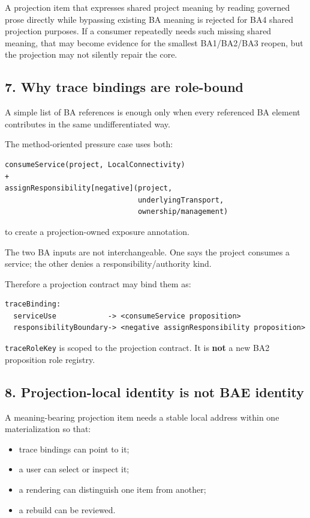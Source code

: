 \documentclass[11pt,a4paper]{article}
\providecommand{\tightlist}{\setlength{\itemsep}{0pt}\setlength{\parskip}{0pt}}
\begin{document}
A projection item that expresses shared project meaning by reading governed prose directly while bypassing existing BA meaning is rejected for BA4 shared projection purposes. If a consumer repeatedly needs such missing shared meaning, that may become evidence for the smallest BA1/BA2/BA3 reopen, but the projection may not silently repair the core.

\subsection{7. Why trace bindings are role-bound}\label{7-why-trace-bindings-are-role-bound}

A simple list of BA references is enough only when every referenced BA element contributes in the same undifferentiated way.

The method-oriented pressure case uses both:

\begin{verbatim}
consumeService(project, LocalConnectivity)
+
assignResponsibility[negative](project,
                               underlyingTransport,
                               ownership/management)
\end{verbatim}

to create a projection-owned exposure annotation.

The two BA inputs are not interchangeable. One says the project consumes a service; the other denies a responsibility/authority kind.

Therefore a projection contract may bind them as:

\begin{verbatim}
traceBinding:
  serviceUse            -> <consumeService proposition>
  responsibilityBoundary-> <negative assignResponsibility proposition>
\end{verbatim}

\texttt{traceRoleKey} is scoped to the projection contract. It is \textbf{not} a new BA2 proposition role registry.

\subsection{8. Projection-local identity is not BAE identity}\label{8-projection-local-identity-is-not-bae-identity}

A meaning-bearing projection item needs a stable local address within one materialization so that:

\begin{itemize}
\tightlist
\item
  trace bindings can point to it;
\item
  a user can select or inspect it;
\item
  a rendering can distinguish one item from another;
\item
  a rebuild can be reviewed.
\end{itemize}
\end{document}
